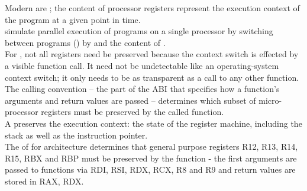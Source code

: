 \newpage
{}\label{mechanism}

Modern  are ; the content of
processor registers represent the execution context of the program at a given
point in time.\\
 simulate parallel execution of programs on a single
processor by switching between programs () by
 and  the content of .\\

For \cc, not all registers need be preserved because the context switch is
effected by a visible function call. It need not be undetectable like an
operating-system context switch; it only needs to be as transparent as a call
to any other function. The calling convention -- the
part of the ABI that specifies how a function's arguments and return values are
passed -- determines which subset of micro-processor registers must be
preserved by the called function.\\

A \cont preserves the execution context: the state of
the register machine, including the stack as well as the instruction pointer.\\

The \cite{SYSVABI} of  for 
architecture determines that general purpose registers R12, R13, R14, R15, RBX
and RBP must be preserved by the function - the first arguments are passed
to functions via RDI, RSI, RDX, RCX, R8 and R9 and return values are stored in
RAX, RDX.\\


